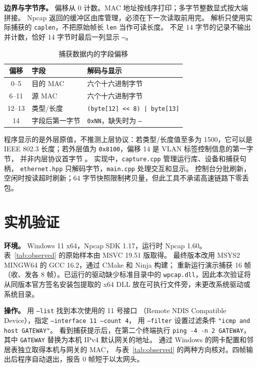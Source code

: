 \documentclass[acmsmall,nonacm]{acmart}
\begin{document}
\textbf{边界与字节序。}
偏移从 0 计数。MAC 地址按线序打印；多字节整数显式按大端拼接。
Npcap 返回的缓冲区由库管理，必须在下一次读取前用完。
解析只使用实际捕获的 \texttt{caplen}，不把原始帧长 \texttt{len} 当作可读长度。
不足 14 字节的记录不输出并计数，恰好 14 字节时最后一列显示 \texttt{--}。

\begin{table}[h]
\caption{捕获数据内的字段偏移}
\label{tab:offsets}
\centering\small
\begin{tabular}{@{}cll@{}}
\toprule
偏移 & 字段 & 解码与显示 \\
\midrule
0--5   & 目的 MAC & 六个十六进制字节 \\
6--11  & 源 MAC & 六个十六进制字节 \\
12--13 & 类型/长度 & \texttt{(byte[12] << 8) | byte[13]} \\
14     & 字段后第一字节 & \texttt{0xNN}，缺失时为 \texttt{--} \\
\bottomrule
\end{tabular}
\end{table}

程序显示的是外层原值，不推测上层协议：若类型/长度值至多为 1500，它可以是
IEEE 802.3 长度；若外层值为 \texttt{0x8100}，偏移 14 是 VLAN 标签控制信息的第一字节，
并非内层协议首字节 \cite{ieee-numbers}。
实现中，\texttt{capture.cpp} 管理运行库、设备和捕获句柄，
\texttt{ethernet.hpp} 只解码字节，\texttt{main.cpp} 处理交互和显示。
控制台分批刷新，空闲时按读超时刷新；64 字节快照限制拷贝量，但此工具不承诺高速链路下零丢包。

\section{实机验证}

\textbf{环境。} Windows 11 x64，Npcap SDK 1.17，运行时 Npcap 1.60。
表~\ref{tab:observed} 的原始样本由 MSVC 19.51 版取得。
最终版本改用 MSYS2 MINGW64 的 GCC 16.2，通过 CMake 和 Ninja 构建；
重新运行演示捕获 16 帧（收、发各 8 帧）。已运行的驱动缺少标准目录中的
\texttt{wpcap.dll}，因此本次验证将从同版本官方签名安装包提取的 x64 DLL
放在可执行文件旁，未更改系统驱动或系统目录。

\textbf{操作。} 用 \texttt{--list} 找到本次使用的 11 号接口
（Remote NDIS Compatible Device），指定 \texttt{--interface 11 --count 4}，
用 \texttt{--filter} 设置过滤条件 \texttt{"icmp and host GATEWAY"}。
看到捕获提示后，在第二个终端执行 \texttt{ping -4 -n 2 GATEWAY}，
其中 \texttt{GATEWAY} 替换为本机 IPv4 默认网关的地址。
通过 Windows 的网卡配置和邻居表独立取得本机与网关的 MAC，
与表~\ref{tab:observed} 的两种方向核对。四帧输出后程序自动退出，报告 0 帧短于以太网头。
\end{document}
